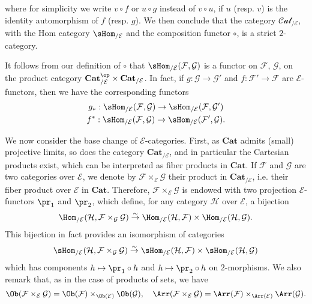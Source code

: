 where for simplicity we write $v\circ f$ or $u\circ g$ instead of $v\circ u$, if $u$ (resp. $v$) is the identity automorphism of $f$ (resp. $g$). We then conclude that the category $\mathcal{Cat}_{/\mathcal{E}}$, with the Hom category $\sHom_{/\mathcal{E}}$ and the composition functor $\circ$, is a strict $2$-category.\par
It follows from our definition of $\circ$ that $\sHom_{/\mathcal{E}}(\mathcal{F},\mathcal{G})$ is a functor on $\mathcal{F}$, $\mathcal{G}$, on the product category $\mathbf{Cat}_{/\mathcal{E}}^{\op}\times\mathbf{Cat}_{/\mathcal{E}}$. In fact, if $g:\mathcal{G}\to \mathcal{G}'$ and $f:\mathcal{F}'\to \mathcal{F}$ are $\mathcal{E}$-functors, then we have the corresponding functors
\begin{gather*}
g_*:\sHom_{/\mathcal{E}}(\mathcal{F},\mathcal{G})\to \sHom_{/\mathcal{E}}(\mathcal{F},\mathcal{G}')\\
f^*:\sHom_{/\mathcal{E}}(\mathcal{F},\mathcal{G})\to \sHom_{/\mathcal{E}}(\mathcal{F}',\mathcal{G}).
\end{gather*}

We now consider the base change of $\mathcal{E}$-categories. First, as $\mathbf{Cat}$ admits (small) projective limits, so does the category $\mathbf{Cat}_{/\mathcal{E}}$, and in particular the Cartesian products exist, which can be interpreted as fiber products in $\mathbf{Cat}$. If $\mathcal{F}$ and $\mathcal{G}$ are two categories over $\mathcal{E}$, we denote by $\mathcal{F}\times_{\mathcal{E}}\mathcal{G}$ their product in $\mathbf{Cat}_{/\mathcal{E}}$, i.e. their fiber product over $\mathcal{E}$ in $\mathbf{Cat}$. Therefore, $\mathcal{F}\times_{\mathcal{E}}\mathcal{G}$ is endowed with two projection $\mathcal{E}$-functors $\pr_1$ and $\pr_2$, which define, for any category $\mathcal{H}$ over $\mathcal{E}$, a bijection
\[\Hom_{/\mathcal{E}}(\mathcal{H},\mathcal{F}\times_\mathcal{G}\mathcal{G})\stackrel{\sim}{\to }\Hom_{/\mathcal{E}}(\mathcal{H},\mathcal{F})\times\Hom_{/\mathcal{E}}(\mathcal{H},\mathcal{G}).\]
This bijection in fact provides an isomorphism of categories
\[\sHom_{/\mathcal{E}}(\mathcal{H},\mathcal{F}\times_\mathcal{G}\mathcal{G})\stackrel{\sim}{\to }\sHom_{/\mathcal{E}}(\mathcal{H},\mathcal{F})\times\sHom_{/\mathcal{E}}(\mathcal{H},\mathcal{G})\]
which has components $h\mapsto\pr_1\circ h$ and $h\mapsto\pr_2\circ h$ on $2$-morphisms. We also remark that, as in the case of products of sets, we have
\[\Ob(\mathcal{F}\times_{\mathcal{E}}\mathcal{G})=\Ob(\mathcal{F})\times_{\Ob(\mathcal{E})}\Ob(\mathcal{G}),\quad \Arr(\mathcal{F}\times_{\mathcal{E}}\mathcal{G})=\Arr(\mathcal{F})\times_{\Arr(\mathcal{E})}\Arr(\mathcal{G}).\]


